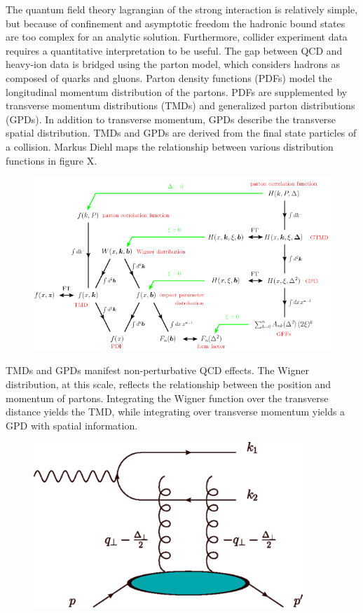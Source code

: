 The quantum field theory lagrangian of the strong interaction is relatively simple, but because of confinement and asymptotic freedom the hadronic bound states are too complex for an analytic solution. Furthermore, collider experiment data requires a quantitative interpretation to be useful. The gap between QCD and heavy-ion data is bridged using the parton model, which considers hadrons as composed of quarks and gluons. Parton density functions (PDFs) model the longitudinal momentum distribution of the partons. PDFs are supplemented by transverse momentum distributions (TMDs) and generalized parton distributions (GPDs). In addition to transverse momentum, GPDs describe the transverse spatial distribution. TMDs and GPDs are derived from the final state particles of a collision. Markus Diehl maps the relationship between various distribution functions in figure X.

\begin{figure}[h!]
\begin{centering}
\includegraphics[width=7in]{Chapter2/importfigs/fig6_introGPD_TMD.png}
\par\end{centering}
\end{figure}

TMDs and GPDs manifest non-perturbative QCD effects. The Wigner distribution, at this scale, reflects the relationship between the position and momentum of partons. Integrating the Wigner function over the transverse distance yields the TMD, while integrating over transverse momentum yields a GPD with spatial information. 

\begin{figure}[h!]
\begin{centering}
\includegraphics[width=4in]{Chapter2/importfigs/fig4_yatta.png}
\par\end{centering}
\end{figure}

